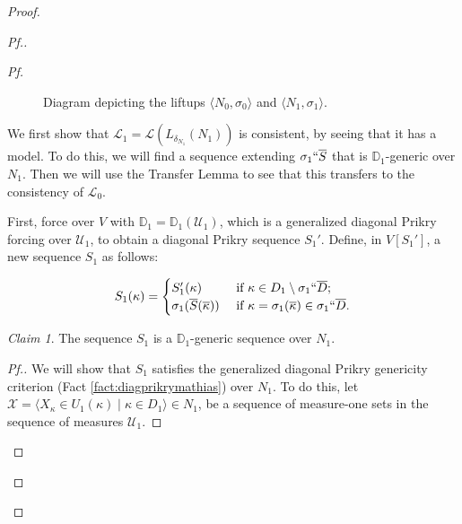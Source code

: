 \documentclass{amsart}
\theoremstyle{definition}
\theoremstyle{remark}
\newtheorem{claimno}{Claim}
\newcommand{\D}{\mathbb{D}}
\renewcommand{\S}{{\overline{S}}}
\newcommand{\U}{\mathcal{U}}
\newcommand{\st}{\; | \;}
\newcommand{\seq}[2]{\langle #1 \st #2 \rangle}
\begin{document}
\begin{proof}
\begin{proof}[Pf.]
\begin{proof}[Pf]
\begin{figure}[h!]
\label{figure:N1N0N} \caption{Diagram depicting the liftups $\langle N_0, \sigma_0\rangle$ and $\langle N_1, \sigma_1\rangle$.}
\end{figure} 

We first show that $\mathcal L_1=\mathcal L(L_{\delta_{N_1}}(N_1))$ is consistent, by seeing that it has a model. To do this, we will find a sequence extending $\sigma_1``\S$ that is $\D_1$-generic over $N_1$. Then we will use the Transfer Lemma to see that this transfers to the consistency of $\mathcal L_0$. %

First, force over $V$ with $\D_1 = \D_1(\mathcal U_1)$, which is a generalized diagonal Prikry forcing over $\mathcal U_1$, to obtain a diagonal Prikry sequence $S_1'$. 
Define, in $V[S_1']$, a new sequence $S_1$ as follows:

$$S_1(\kappa) = \begin{cases} S_1'(\kappa) &\text{ if } \kappa \in D_1 \setminus \sigma_1``\overline D; \\
					\sigma_1(\overline S(\overline \kappa)) &\text{ if } \kappa = \sigma_1(\overline \kappa) \in \sigma_1``\overline D. \end{cases}$$

\begin{claimno} \label{Claim:S_1isPrikryoverN_1} The sequence $S_1$ is a $\D_1$-generic sequence over $N_1$. \end{claimno}
\begin{proof}[Pf.]
We will show that $S_1$ satisfies the generalized diagonal Prikry genericity criterion (Fact \ref{fact:diagprikrymathias}) over $N_1$. To do this, let $\mathcal X = \seq{ X_\kappa \in U_1(\kappa) }{ \kappa \in D_1 } \in N_1$, be a sequence of measure-one sets in the sequence of measures $\U_1$.


\end{proof}
\end{proof}
\end{proof}
\end{proof}
\end{document}
